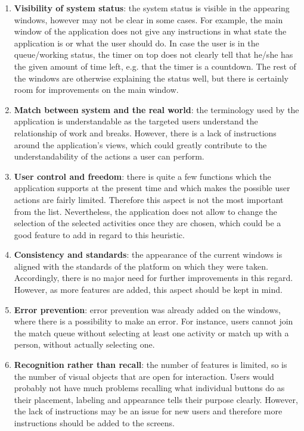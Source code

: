 \begin{enumerate}
	\item \textbf{Visibility of system status}: the system status is visible in the appearing windows, however may not be clear in some cases. For example, the main window of the application does not give any instructions in what state the application is or what the user should do. In case the user is in the queue/working status, the timer on top does not clearly tell that he/she has the given amount of time left, e.g. that the timer is a countdown. The rest of the windows are otherwise explaining the status well, but there is certainly room for improvements on the main window. 
	\item \textbf{Match between system and the real world}: the terminology used by the application is understandable as the targeted users understand the relationship of work and breaks. However, there is a lack of instructions around the application's views, which could greatly contribute to the understandability of the actions a user can perform.
	\item \textbf{User control and freedom}: there is quite a few functions which the application supports at the present time and which makes the possible user actions are fairly limited. Therefore this aspect is not the most important from the list. Nevertheless, the application does not allow to change the selection of the selected activities once they are chosen, which could be a good feature to add in regard to this heuristic. 
	\item \textbf{Consistency and standards}: the appearance of the current windows is aligned with the standards of the platform on which they were taken. Accordingly, there is no major need for further improvements in this regard. However, as more features are added, this aspect should be kept in mind.
	\item \textbf{Error prevention}: error prevention was already added on the windows, where there is a possibility to make an error. For instance, users cannot join the match queue without selecting at least one activity or match up with a person, without actually selecting one. 
	\item \textbf{Recognition rather than recall}: the number of features is limited, so is the number of visual objects that are open for interaction. Users would probably not have much problems recalling what individual buttons do as their placement, labeling and appearance tells their purpose clearly. However, the lack of instructions may be an issue for new users and therefore more instructions should be added to the screens.

\end{enumerate}
